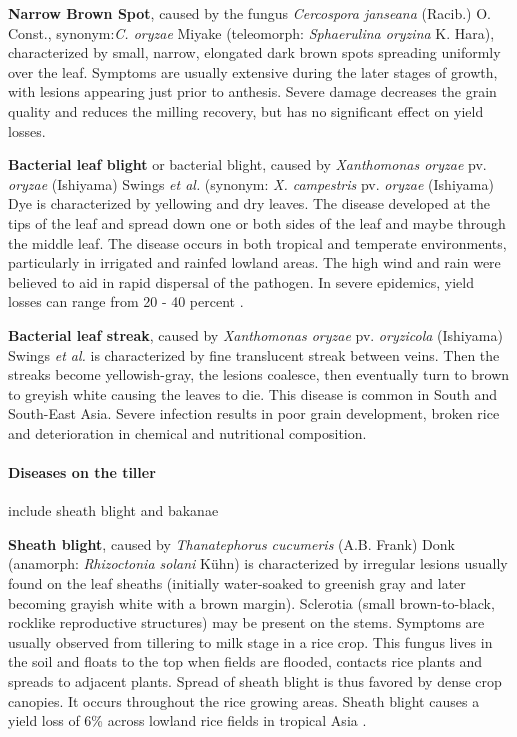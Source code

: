 \textbf{Narrow Brown Spot}, caused by the fungus \textit{Cercospora janseana} (Racib.) O. Const., synonym:\textit{C. oryzae} Miyake (teleomorph: \textit{Sphaerulina oryzina} K. Hara),  characterized by small, narrow, elongated dark brown spots spreading uniformly over the leaf. Symptoms are usually extensive during the later stages of growth, with lesions appearing just prior to anthesis. Severe damage decreases the grain quality and reduces the milling recovery, but has no significant effect on yield losses. 

\textbf{Bacterial leaf blight} or bacterial blight, caused by \textit{Xanthomonas oryzae} pv. \textit{oryzae} (Ishiyama) Swings \textit{et al.} (synonym: \textit{X. campestris} pv. \textit{oryzae} (Ishiyama) Dye is characterized by yellowing and dry leaves. The disease developed at the tips of the leaf and spread down one or both sides of the leaf and maybe through the middle leaf. The disease occurs in both tropical and temperate environments, particularly in irrigated and rainfed lowland areas. The high wind and rain were believed to aid in rapid dispersal of the pathogen. In severe epidemics, yield losses can range from 20 - 40 percent \citep{Sonti_1998_Bacterial}.

\textbf{Bacterial leaf streak}, caused by \textit{Xanthomonas oryzae} pv. \textit{oryzicola} (Ishiyama) Swings \textit{et al.} is characterized by fine translucent streak between veins. Then the streaks become yellowish-gray, the lesions coalesce, then eventually turn to brown to greyish white causing the leaves to die. This disease is common in South and South-East Asia. Severe infection results in poor grain development, broken rice and deterioration in chemical and nutritional composition. 

\paragraph{Diseases on the tiller} include sheath blight and bakanae 

\textbf{Sheath blight}, caused by \textit{Thanatephorus cucumeris} (A.B. Frank) Donk (anamorph: \textit{Rhizoctonia solani} K\"uhn) is characterized by irregular lesions usually found on the leaf sheaths (initially water-soaked to greenish gray and later becoming grayish white with a brown margin). Sclerotia (small brown-to-black, rocklike reproductive structures) may be present on the stems. Symptoms are usually observed from tillering to milk stage in a rice crop. This fungus lives in the soil and floats to the top when fields are flooded, contacts rice plants and spreads to adjacent plants. Spread of sheath blight is thus favored by dense crop canopies. It occurs throughout the rice growing areas. Sheath blight causes a yield loss of 6\%  across lowland rice fields in tropical Asia \cite{Savary_2006_Quantification}.

